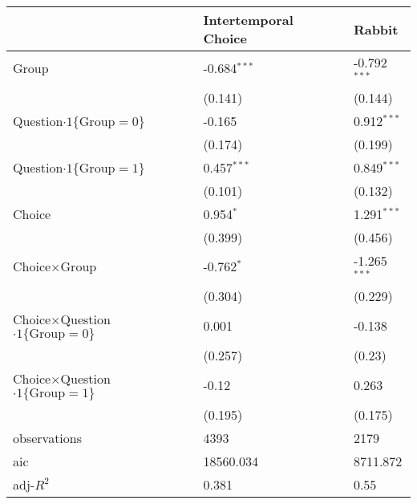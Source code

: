 \begin{tabular}{lll}
\hline
 & Intertemporal Choice & Rabbit \\
\hline
Group & -0.684$^{***}$ & -0.792$^{***}$ \\
 & (0.141) & (0.144) \\
Question$\cdot1\{\text{Group}=0\}$ & -0.165 & 0.912$^{***}$ \\
 & (0.174) & (0.199) \\
Question$\cdot1\{\text{Group}=1\}$ & 0.457$^{***}$ & 0.849$^{***}$ \\
 & (0.101) & (0.132) \\
Choice & 0.954$^{*}$ & 1.291$^{***}$ \\
 & (0.399) & (0.456) \\
Choice$\times$Group & -0.762$^{*}$ & -1.265$^{***}$ \\
 & (0.304) & (0.229) \\
Choice$\times$Question$\cdot1\{\text{Group}=0\}$ & 0.001 & -0.138 \\
 & (0.257) & (0.23) \\
Choice$\times$Question$\cdot1\{\text{Group}=1\}$ & -0.12 & 0.263 \\
 & (0.195) & (0.175) \\\hline

observations & 4393 & 2179 \\
aic & 18560.034 & 8711.872 \\
adj-$R^2$ & 0.381 & 0.55 \\
\hline
\end{tabular}
